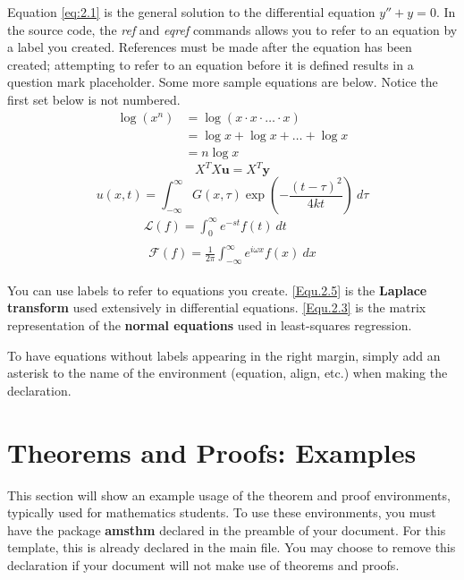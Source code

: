 Equation \ref{eq:2.1} is the general solution to the differential equation $y''+y=0$. In the source code, the {\it ref} and {\it eqref} commands allows you to refer to an equation by a label you created. References must be made after the equation has been created; attempting to refer to an equation before it is defined results in a question mark placeholder. Some more sample equations are below. Notice the first set below is not numbered.
\begin{align*}
\log (x^n) &= \log (x \cdot x \cdot \ldots \cdot x) \\
&= \log x + \log x + \ldots + \log x \\
&= n \log x
\end{align*}
\begin{equation} \label{Equ.2.3}
X^T X \mathbf{u} = X^T \mathbf{y}
\end{equation}
\begin{equation}\label{Equ.2.4}
u(x, t) = \int_{-\infty}^{\infty} G(x, \tau) \exp\left(-\frac{(t-\tau)^2}{4kt}\right) \ d\tau
\end{equation}
\begin{gather}
\mathcal{L}(f) = \int_{0}^{\infty} e^{-st} f(t) \ dt \\
\begin{split} \label{Equ.2.5}
\mathcal{F}(f) = \frac{1}{2\pi}\int_{-\infty}^{\infty} e^{i \omega x} f(x) \ dx
\end{split}
\end{gather}

You can use labels to refer to equations you create. \ref{Equ.2.5} is the \textbf{Laplace transform} used extensively in differential equations. \ref{Equ.2.3} is the matrix representation of the \textbf{normal equations} used in least-squares regression.

To have equations without labels appearing in the right margin, simply add an asterisk to the name of the environment (equation, align, etc.) when making the declaration.


\section{Theorems and Proofs: Examples}

This section will show an example usage of the theorem and proof environments, typically used for mathematics students. To use these environments, you must have the package \textbf{amsthm} declared in the preamble of your document. For this template, this is already declared in the main file. You may choose to remove this declaration if your document will not make use of theorems and proofs.

